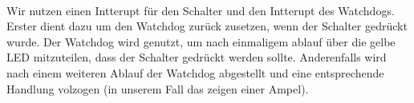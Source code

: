 

\paragraph*{}
Wir nutzen einen Intterupt für den Schalter und den Intterupt des Watchdogs. Erster dient dazu um den Watchdog zurück zusetzen, wenn der Schalter gedrückt wurde. Der Watchdog wird genutzt, um nach einmaligem ablauf über die gelbe LED mitzuteilen, dass der Schalter gedrückt werden sollte. Anderenfalls wird nach einem weiteren Ablauf der Watchdog abgestellt und eine entsprechende Handlung volzogen (in unserem Fall das zeigen einer Ampel). \\ 


